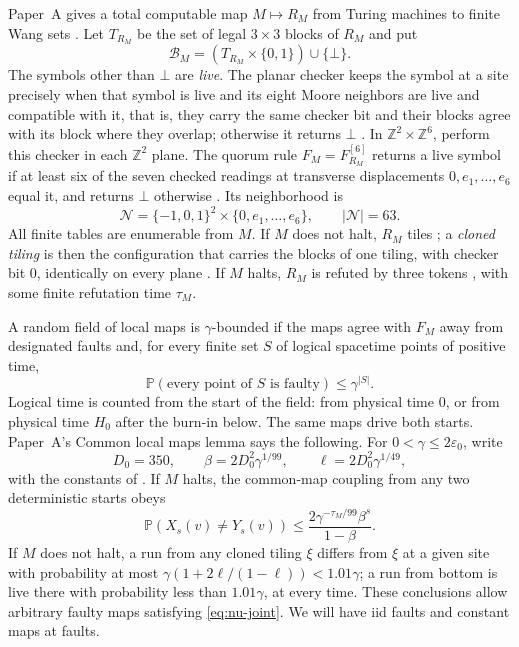 \documentclass[11pt]{article}
\theoremstyle{plain}
\theoremstyle{definition}
\theoremstyle{remark}
\newcommand{\Z}{\mathbb Z}
\newcommand{\Prob}{\mathbb P}
\newcommand{\eps}{\varepsilon}
\begin{document}
Paper~A gives a total computable map $M\mapsto R_M$ from Turing machines to finite Wang sets \cite[Definition~6.17]{DM26A}. Let $T_{R_M}$ be the set of legal $3\times3$ blocks of $R_M$ and put
\[
 \mathcal B_M=(T_{R_M}\times\{0,1\})\cup\{\bot\}.
\]
The symbols other than $\bot$ are \emph{live}. The planar checker keeps the symbol at a site precisely when that symbol is live and its eight Moore neighbors are live and compatible with it, that is, they carry the same checker bit and their blocks agree with its block where they overlap; otherwise it returns $\bot$ \cite[Definition~2.5]{DM26A}. In $\Z^2\times\Z^6$, perform this checker in each $\Z^2$ plane. The quorum rule $F_M=F^{[6]}_{R_M}$ returns a live symbol if at least six of the seven checked readings at transverse displacements $0,e_1,\ldots,e_6$ equal it, and returns $\bot$ otherwise \cite[Definition~2.7]{DM26A}. Its neighborhood is
\begin{equation}\label{eq:nu-neighborhood}
 \mathcal N=\{-1,0,1\}^2\times\{0,e_1,\ldots,e_6\},
 \qquad |\mathcal N|=63.
\end{equation}
All finite tables are enumerable from $M$. If $M$ does not halt, $R_M$ tiles \cite[Proposition~6.18]{DM26A}; a \emph{cloned tiling} is then the configuration that carries the blocks of one tiling, with checker bit $0$, identically on every plane \cite[Definition~4.1]{DM26A}. If $M$ halts, $R_M$ is refuted by three tokens \cite[Theorem~9.1]{DM26A}, with some finite refutation time $\tau_M$.

A random field of local maps is $\gamma$-bounded \cite[Definition~8.10]{DM26A} if the maps agree with $F_M$ away from designated faults and, for every finite set $S$ of logical spacetime points of positive time,
\begin{equation}\label{eq:nu-joint}
 \Prob(\text{every point of }S\text{ is faulty})\le\gamma^{|S|}.
\end{equation}
Logical time is counted from the start of the field: from physical time $0$, or from physical time $H_0$ after the burn-in below. The same maps drive both starts. Paper~A's Common local maps lemma \cite[Lemma~8.11]{DM26A} says the following. For $0<\gamma\le2\eps_0$, write
\[
 D_0=350,\qquad
 \beta=2D_0^2\gamma^{1/99},\qquad
 \ell=2D_0^2\gamma^{1/49},
\]
with the constants of \cite[Corollary~9.21]{DM26A}. If $M$ halts, the common-map coupling from any two deterministic starts obeys
\begin{equation}\label{eq:nu-import-forget}
 \Prob(X_s(v)\ne Y_s(v))
 \le \frac{2\gamma^{-\tau_M/99}\beta^s}{1-\beta}.
\end{equation}
If $M$ does not halt, a run from any cloned tiling $\xi$ differs from $\xi$ at a given site with probability at most $\gamma(1+2\ell/(1-\ell))<1.01\gamma$; a run from bottom is live there with probability less than $1.01\gamma$, at every time. These conclusions allow arbitrary faulty maps satisfying \eqref{eq:nu-joint}. We will have iid faults and constant maps at faults.
\end{document}
